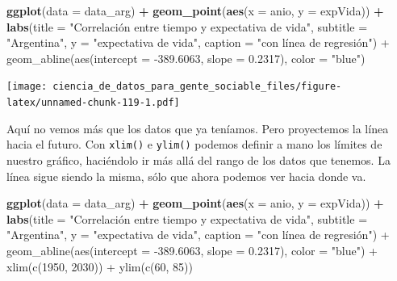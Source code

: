 \documentclass[spanish,]{book}
\newenvironment{Shaded}{\begin{snugshade}}{\end{snugshade}}
\newcommand{\DataTypeTok}[1]{\textcolor[rgb]{0.13,0.29,0.53}{#1}}
\newcommand{\KeywordTok}[1]{\textcolor[rgb]{0.13,0.29,0.53}{\textbf{#1}}}
\newcommand{\NormalTok}[1]{#1}
\newcommand{\OperatorTok}[1]{\textcolor[rgb]{0.81,0.36,0.00}{\textbf{#1}}}
\newcommand{\StringTok}[1]{\textcolor[rgb]{0.31,0.60,0.02}{#1}}
\begin{document}
\begin{Shaded}
\begin{Highlighting}[]
\KeywordTok{ggplot}\NormalTok{(}\DataTypeTok{data =}\NormalTok{ data_arg) }\OperatorTok{+}\StringTok{ }
\StringTok{    }\KeywordTok{geom_point}\NormalTok{(}\KeywordTok{aes}\NormalTok{(}\DataTypeTok{x =}\NormalTok{ anio, }\DataTypeTok{y =}\NormalTok{ expVida)) }\OperatorTok{+}
\StringTok{    }\KeywordTok{labs}\NormalTok{(}\DataTypeTok{title =} \StringTok{"Correlación entre tiempo y expectativa de vida"}\NormalTok{,}
         \DataTypeTok{subtitle =} \StringTok{"Argentina"}\NormalTok{,}
         \DataTypeTok{y =} \StringTok{"expectativa de vida"}\NormalTok{,}
         \DataTypeTok{caption =} \StringTok{"con línea de regresión") +}
\StringTok{    geom_abline(aes(intercept = -389.6063, slope = 0.2317), color = "}\NormalTok{blue}\StringTok{")}
\end{Highlighting}
\end{Shaded}

\texttt{[image: ciencia\_de\_datos\_para\_gente\_sociable\_files/figure-latex/unnamed-chunk-119-1.pdf]}

Aquí no vemos más que los datos que ya teníamos. Pero proyectemos la línea hacia el futuro. Con \texttt{xlim()} e \texttt{ylim()} podemos definir a mano los límites de nuestro gráfico, haciéndolo ir más allá del rango de los datos que tenemos. La línea sigue siendo la misma, sólo que ahora podemos ver hacia donde va.

\begin{Shaded}
\begin{Highlighting}[]
\KeywordTok{ggplot}\NormalTok{(}\DataTypeTok{data =}\NormalTok{ data_arg) }\OperatorTok{+}\StringTok{ }
\StringTok{    }\KeywordTok{geom_point}\NormalTok{(}\KeywordTok{aes}\NormalTok{(}\DataTypeTok{x =}\NormalTok{ anio, }\DataTypeTok{y =}\NormalTok{ expVida)) }\OperatorTok{+}
\StringTok{    }\KeywordTok{labs}\NormalTok{(}\DataTypeTok{title =} \StringTok{"Correlación entre tiempo y expectativa de vida"}\NormalTok{,}
         \DataTypeTok{subtitle =} \StringTok{"Argentina"}\NormalTok{,}
         \DataTypeTok{y =} \StringTok{"expectativa de vida"}\NormalTok{,}
         \DataTypeTok{caption =} \StringTok{"con línea de regresión") +}
\StringTok{    geom_abline(aes(intercept = -389.6063, slope = 0.2317), color = "}\NormalTok{blue}\StringTok{") +}
\StringTok{    xlim(c(1950, 2030)) +}
\StringTok{    ylim(c(60, 85))}
\end{Highlighting}
\end{Shaded}
\end{document}
